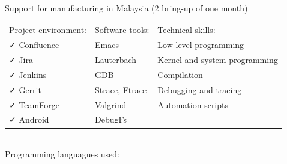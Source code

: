 \documentclass[letterpaper]{jm-cv} %
\begin{document}
{  {\footnotesize\color{maingray}\bullet} Support for manufacturing in Malaysia (2 bring-up of one month)\\

  \begin{tabular}{ l l l }
    Project environment: & \hspace{1cm}Software tools: & \hspace{1cm}Technical skills:\\
    {\color{mainblue}\faCheck} Confluence &
    \hspace{1cm}{\color{maingreen}\faCheck} Emacs &
    \hspace{1cm}{\color{maingray}\faCheck} Low-level programming\\

    {\color{mainblue}\faCheck} Jira &
    \hspace{1cm}{\color{maingreen}\faCheck} Lauterbach &
    \hspace{1cm}{\color{maingray}\faCheck} Kernel and system programming\\

    {\color{mainblue}\faCheck} Jenkins &
    \hspace{1cm}{\color{maingreen}\faCheck} GDB &
    \hspace{1cm}{\color{maingray}\faCheck} Compilation\\

    {\color{mainblue}\faCheck} Gerrit &
    \hspace{1cm}{\color{maingreen}\faCheck} Strace, Ftrace &
    \hspace{1cm}{\color{maingray}\faCheck} Debugging and tracing\\

    {\color{mainblue}\faCheck} TeamForge &
    \hspace{1cm}{\color{maingreen}\faCheck} Valgrind &
    \hspace{1cm}{\color{maingray}\faCheck} Automation scripts \\

    {\color{mainblue}\faCheck} Android &
    \hspace{1cm}{\color{maingreen}\faCheck} DebugFs &

  \end{tabular}\\

  Programming languagues used:\\
}
\end{document}
